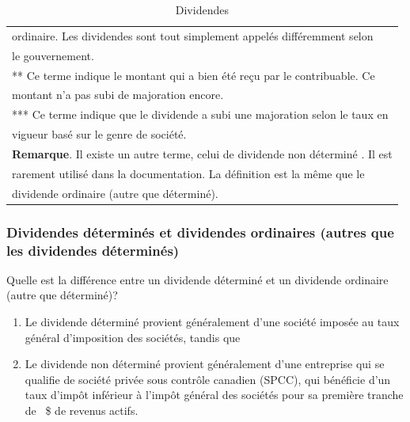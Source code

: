 \begin{table}
\begin{tabular}{|l|c|}
		\multicolumn{2}{|l|}{ordinaire. Les dividendes sont tout simplement \og appelés \fg{} différemment selon}              \\
		\multicolumn{2}{|l|}{le gouvernement.}                                                                                 \\
		\multicolumn{2}{|l|}{** Ce terme indique le montant qui a bien été reçu par le contribuable. Ce }                      \\
		\multicolumn{2}{|l|}{montant n'a pas subi de majoration encore.}                                                       \\
		\multicolumn{2}{|l|}{*** Ce terme indique que le dividende a subi une majoration selon le taux en }                    \\
		\multicolumn{2}{|l|}{vigueur basé sur le genre de société.}                                                            \\
		\multicolumn{2}{|l|}{\textbf{Remarque}. Il existe un autre terme, celui de \og dividende non déterminé \fg{}. Il est } \\
		\multicolumn{2}{|l|}{rarement utilisé dans la documentation. La définition est la même que le}                         \\
		\multicolumn{2}{|l|}{dividende ordinaire (autre que déterminé).}                                                       \\ \hline
	\end{tabular}
	\caption{Dividendes}
	\label{table:dividendes}
\end{table}


\subsubsection{Dividendes déterminés et dividendes ordinaires (autres que les dividendes déterminés)}
Quelle est la différence entre un dividende déterminé et un dividende ordinaire (autre que déterminé)?
\begin{enumerate}
	\item Le dividende déterminé provient généralement d'une société imposée au taux général d'imposition des sociétés, tandis que
	\item Le dividende non déterminé provient généralement d'une entreprise qui se qualifie de société privée sous contrôle canadien (SPCC), qui bénéficie d'un taux d'impôt inférieur à l'impôt général des sociétés pour sa première tranche de ~\$ de revenus actifs.
\end{enumerate}


